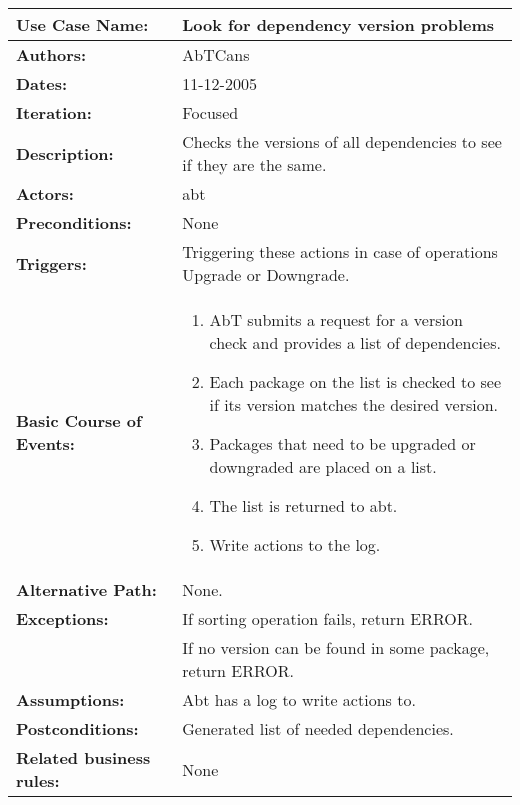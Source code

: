 \begin{tabularx}{\linewidth}{|l|X|}
\hline
\textbf{Use Case Name:} & \textbf{Look for dependency version problems} \\
\hline
\textbf{Authors:} & AbTCans\\
\hline
\textbf{Dates:} & 11-12-2005\\
\hline
\textbf{Iteration:} & Focused\\
\hline
\textbf{Description:} & Checks the versions of all dependencies to see if they are the same.\\
\hline
\textbf{Actors:} & abt\\ 
\hline
\textbf{Preconditions:} & None\\
\hline
\textbf{Triggers:} & Triggering these actions in case of operations Upgrade or Downgrade.\\
\hline
\textbf{Basic Course of Events:} & 
\begin{minipage}{\linewidth} 
  \vspace{0.05em}
  \begin{enumerate}
   \item AbT submits a request for a version check and provides a list of dependencies.
   \item Each package on the list is checked to see if its version matches the desired version.
   \item Packages that need to be upgraded or downgraded are placed on a list.
   \item The list is returned to abt. 
   \item Write actions to the log.
  \end{enumerate}
  \vspace{0.05em}
\end{minipage}
\\
\hline 
\textbf{Alternative Path:} & None.\\
\hline

\textbf{Exceptions:} & If sorting operation fails, return ERROR.\\
 & If no version can be found in some package, return ERROR.\\
\hline
\textbf{Assumptions:} & Abt has a log to write actions to. \\
\hline
\textbf{Postconditions:} & Generated list of needed dependencies.\\
\hline
\textbf{Related business rules:} & None\\
\hline
\end{tabularx}


    